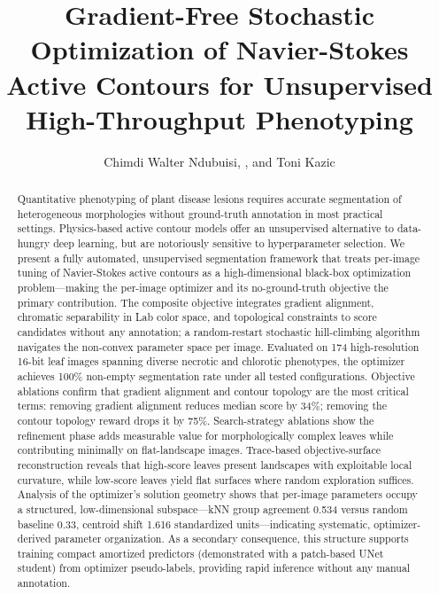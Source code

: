 \documentclass[journal]{IEEEtran}
\begin{document}
\title{Gradient-Free Stochastic Optimization of Navier-Stokes Active Contours for Unsupervised High-Throughput Phenotyping}

\author{Chimdi Walter Ndubuisi, , and Toni Kazic}

\maketitle

\begin{abstract}
Quantitative phenotyping of plant disease lesions requires accurate segmentation of heterogeneous morphologies without ground-truth annotation in most practical settings. Physics-based active contour models offer an unsupervised alternative to data-hungry deep learning, but are notoriously sensitive to hyperparameter selection. We present a fully automated, unsupervised segmentation framework that treats per-image tuning of Navier-Stokes active contours as a high-dimensional black-box optimization problem---making the per-image optimizer and its no-ground-truth objective the primary contribution. The composite objective integrates gradient alignment, chromatic separability in Lab color space, and topological constraints to score candidates without any annotation; a random-restart stochastic hill-climbing algorithm navigates the non-convex parameter space per image. Evaluated on 174 high-resolution 16-bit leaf images spanning diverse necrotic and chlorotic phenotypes, the optimizer achieves 100\% non-empty segmentation rate under all tested configurations. Objective ablations confirm that gradient alignment and contour topology are the most critical terms: removing gradient alignment reduces median score by 34\%; removing the contour topology reward drops it by 75\%. Search-strategy ablations show the refinement phase adds measurable value for morphologically complex leaves while contributing minimally on flat-landscape images. Trace-based objective-surface reconstruction reveals that high-score leaves present landscapes with exploitable local curvature, while low-score leaves yield flat surfaces where random exploration suffices. Analysis of the optimizer's solution geometry shows that per-image parameters occupy a structured, low-dimensional subspace---kNN group agreement 0.534 versus random baseline 0.33, centroid shift 1.616 standardized units---indicating systematic, optimizer-derived parameter organization. As a secondary consequence, this structure supports training compact amortized predictors (demonstrated with a patch-based UNet student) from optimizer pseudo-labels, providing rapid inference without any manual annotation.
\end{abstract}
\end{document}
